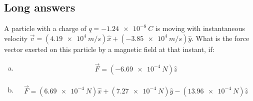 \subsection{Long answers}
\question A particle with a charge of $q=\SI{-1.24e-8}{C}$ is moving with instantaneous velocity $\vec{v}=(\SI{4.19e4}{m/s})\hat{x}+(\SI{-3.85e4}{m/s})\hat{y}$. What is the force vector exerted on this particle by a magnetic field at that instant, if:
\begin{finalanswer}
\begin{enumerate}[(a)]
\item \begin{align*}
\vec{F}=(\SI{-6.69e-4}{N})\hat{z}
\end{align*}
\item  \begin{align*}
\vec{F}=(\SI{6.69e-4}{N})\hat x+ (\SI{7.27e-4}{N})\hat y -(\SI{13.96e-4}{N})\hat z
\end{align*}
\end{enumerate}
\end{finalanswer}
